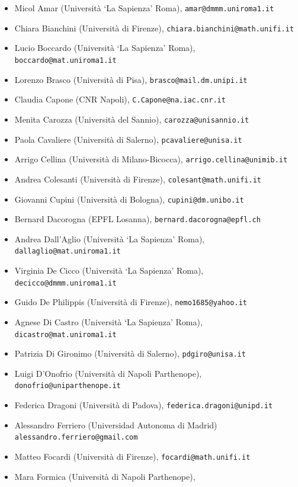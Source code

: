 \documentclass[12pt]{article}
\begin{document}
\begin{itemize}
\item[]Micol Amar (Universit\`a `La Sapienza' Roma), 
{\tt amar@dmmm.uniroma1.it}
\item[]Chiara Bianchini (Universit\`a di Firenze), 
{\tt chiara.bianchini@math.unifi.it}
\item[]Lucio Boccardo (Universit\`a `La Sapienza' Roma),
{\tt boccardo@mat.uniroma1.it} 
\item[]Lorenzo Brasco  (Universit\`a di Pisa), 
{\tt brasco@mail.dm.unipi.it} 
\item[]Claudia Capone (CNR Napoli), 
{\tt C.Capone@na.iac.cnr.it} 
\item[]Menita Carozza (Universit\`a del Sannio), 
{\tt carozza@unisannio.it} 
\item[]Paola Cavaliere (Universit\`a di Salerno), 
{\tt pcavaliere@unisa.it} 
\item[]Arrigo Cellina (Universit\`a di Milano-Bicocca), 
{\tt arrigo.cellina@unimib.it} 
\item[]Andrea Colesanti  (Universit\`a di Firenze), 
{\tt colesant@math.unifi.it} 
\item[]Giovanni Cupini  (Universit\`a di Bologna),
{\tt cupini@dm.unibo.it} 
\item[]Bernard Dacorogna (EPFL Losanna), 
{\tt bernard.dacorogna@epfl.ch} 
\item[]Andrea Dall'Aglio (Universit\`a `La Sapienza' Roma), 
{\tt dallaglio@mat.uniroma1.it} 
\item[]Virginia De Cicco (Universit\`a `La Sapienza' Roma), 
{\tt decicco@dmmm.uniroma1.it} 
\item[]Guido De Philippis  (Universit\`a di Firenze),
{\tt nemo1685@yahoo.it} 
\item[]Agnese Di Castro (Universit\`a `La Sapienza' Roma), 
{\tt dicastro@mat.uniroma1.it} 
\item[]Patrizia Di Gironimo (Universit\`a di Salerno), 
{\tt pdgiro@unisa.it} 
\item[]Luigi D'Onofrio  (Universit\`a di Napoli Parthenope), 
{\tt donofrio@uniparthenope.it} 
\item[]Federica Dragoni (Universit\`a di Padova), 
{\tt federica.dragoni@unipd.it} 
\item[]Alessandro Ferriero (Universidad Autonoma di Madrid)
{\tt alessandro.ferriero@gmail.com} 
\item[]Matteo Focardi  (Universit\`a di Firenze), 
{\tt focardi@math.unifi.it} 
\item[]Mara Formica  (Universit\`a di Napoli Parthenope), 

\end{itemize}
\end{document}
